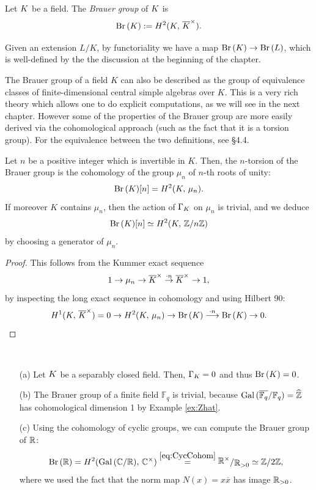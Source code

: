 \documentclass[a4paper, oneside]{memoir}
\begin{document}
\begin{definition}
	Let $K$ be a field. The \textit{Brauer group} of $K$ is
	\[\operatorname{Br}{(K)}:=H^{2}( K, \, \overline{K}^\times ).\]
\end{definition}

\noindent Given an extension $L/K$, by functoriality we have a map $\operatorname{Br}{(K)}\to\operatorname{Br}{(L)}$, which is well-defined by the the discussion at the beginning of the chapter.

\begin{remark}\label{rm:CSA}
	The Brauer group of a field $K$ can also be described as the group of equivalence classes of finite-dimensional central simple algebras over $K$. This is a very rich theory which allows one to do explicit computations, as we will see in the next chapter. However some of the properties of the Brauer group are more easily derived via the cohomological approach (such as the fact that it is a torsion group). For the equivalence between the two definitions, see \cite{GilleSzamuely} \S 4.4.
\end{remark}

\begin{proposition}\label{prop:BrMuN}
	Let $n$ be a positive integer which is invertible in $K$. Then, the $n$-torsion of the Brauer group is the cohomology of the group $\mu_n$ of $n$-th roots of unity:
	\[
		\operatorname{Br}{(K)}[n]=H^{2}( K, \, \mu_n ).
	\]
	If moreover $K$ contains $\mu_n$, then the action of $\Gamma_K$ on $\mu_n$ is trivial, and we deduce
	\[
		\operatorname{Br}{(K)}[n]\simeq H^{2}( K, \, \mathbb{Z}/n\mathbb{Z} )
	\]
	by choosing a generator of $\mu_n$.
\end{proposition}

\begin{proof}
	This follows from the Kummer exact sequence
	\[
		1\to \mu_n\to \overline{K}^\times\overset{\cdot n}{\to} \overline{K}^\times\to 1,
	\]
	by inspecting the long exact sequence in cohomology and using Hilbert 90:
	\[
		H^{1}( K, \, \overline{K}^\times )=0\to H^{2}( K, \, \mu_n )\to \operatorname{Br}{(K)} \overset{\cdot n}{\longrightarrow}\operatorname{Br}{(K)}\to 0.
	\]
\end{proof}

\begin{example}\label{ex:Brauer}\
	\begin{itemize}
		\item[(a)] Let $K$ be a separably closed field. Then, $\Gamma_K=0$ and thus $\operatorname{Br}{(K)}=0$.
		\item[(b)] The Brauer group of a finite field $\mathbb{F}_q$ is trivial, because $\operatorname{Gal}{(\overline{\mathbb{F}_q}/\mathbb{F}_q)}=\widehat{\mathbb{Z}}$ has cohomological dimension 1 by Example \ref{ex:Zhat}.
        \item[(c)] Using the cohomology of cyclic groups, we can compute the Brauer group of $\mathbb{R}$:
            \[
                \Br{\R}=\H{2}{\operatorname{Gal}{(\C/\R)}}{\C^\times}\overset{\ref{eq:CycCohom}}{=}\ssfrac{\R^\times}{\R_{>0}}\simeq\Z/2\Z
            ,\]
            where we used the fact that the norm map $N(x)=x\overline{x}$ has image $\mathbb{R}_{>0}$.
	\end{itemize}
\end{example}
\end{document}
